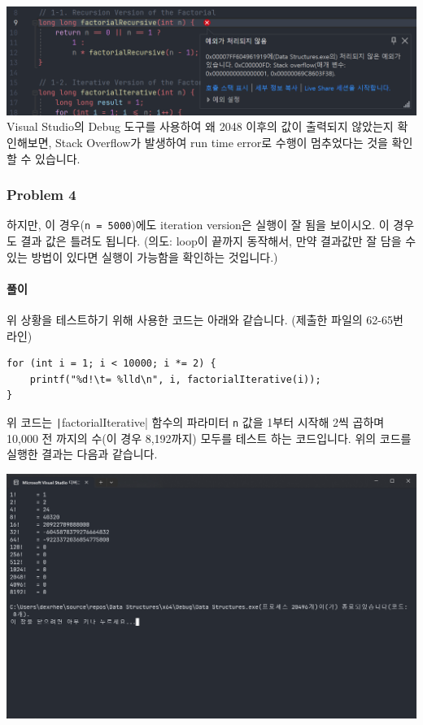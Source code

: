 \includegraphics[width=\textwidth]{./img/3-2.png}
Visual Studio의 Debug 도구를 사용하여 왜 2048 이후의 값이 출력되지 않았는지 확인해보면,
Stack Overflow가 발생하여 run time error로 수행이 멈추었다는 것을 확인할 수 있습니다.

\subsubsection{Problem 4}
하지만, 이 경우(\texttt{n = 5000})에도 iteration version은 실행이 잘 됨을 보이시오.
이 경우도 결과 값은 틀려도 됩니다.
(의도: loop이 끝까지 동작해서, 만약 결과값만 잘 담을 수 있는 방법이 있다면 실행이 가능함을 확인하는 것입니다.)

\paragraph{풀이} 위 상황을 테스트하기 위해 사용한 코드는 아래와 같습니다. (제출한 파일의 62-65번 라인)
\begin{verbatim}
for (int i = 1; i < 10000; i *= 2) {
    printf("%d!\t= %lld\n", i, factorialIterative(i));
}
\end{verbatim}
위 코드는 \texttt|factorialIterative| 함수의 파라미터 \texttt{n} 값을 1부터 시작해 2씩 곱하며 10,000 전 까지의 수(이 경우 8,192까지) 모두를 테스트 하는 코드입니다.
위의 코드를 실행한 결과는 다음과 같습니다.

\includegraphics[width=\textwidth]{./img/4.png}

